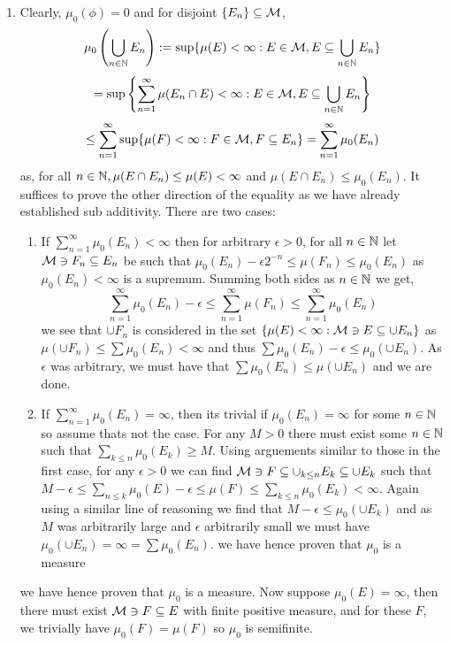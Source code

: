 \documentclass[12pt,a4paper]{article}
\begin{document}
\begin{solution}
    \begin{enumerate}[label=\alph*.]
        \item Clearly, $\mu_0(\phi)=0$ and for disjoint $\{E_n\}\subseteq\mathcal{M}$, 
        $$\mu_0\left(\bigcup_{n\in\mathbb{N}}E_n\right):=\sup\{\mu(E)<\infty:E\in\mathcal{M},E\subseteq\bigcup_{n\in\mathbb{N}}E_n\}$$
        $$=\sup\left\{\sum_{n=1}^\infty\mu(E_n\cap E)<\infty:E\in\mathcal{M},E\subseteq\bigcup_{n\in\mathbb{N}}E_n\right\}$$
        $$\leq\sum_{n=1}^\infty\sup\{\mu(F)<\infty:F\in\mathcal{M},F\subseteq E_n\}=\sum_{n=1}^\infty\mu_0(E_n)$$
        as, for all $n\in\mathbb{N},\mu(E\cap E_n)\leq\mu(E)<\infty$ and $\mu(E\cap E_n)\leq\mu_0(E_n)$.
        It suffices to prove the other direction of the equality as we have already established sub additivity. 
        There are two cases:
        \begin{enumerate}[label=\Roman*.]
            \item If $\sum_{n=1}^{\infty}\mu_0(E_n)<\infty$ then for arbitrary $\epsilon>0$, for all $n\in\mathbb{N}$ let $\mathcal{M}\ni F_n\subseteq E_n$ be such that $\mu_0(E_n)-\epsilon 2^{-n}\leq\mu(F_n)\leq\mu_0(E_n)$ as $\mu_0(E_n)<\infty$ is a supremum. 
            Summing both sides as $n\in\mathbb{N}$ we get,
            $$\sum_{n=1}^\infty\mu_0(E_n)-\epsilon\leq\sum_{n=1}^\infty\mu(F_n)\leq\sum_{n=1}^\infty\mu_0(E_n)$$
            we see that $\cup F_n$ is considered in the set $\{\mu(E)<\infty:\mathcal{M}\ni E\subseteq\cup E_n\}$ as $\mu(\cup F_n)\leq\sum\mu_0(E_n)<\infty$ and thus $\sum\mu_0(E_n)-\epsilon\leq\mu_0(\cup E_n)$. 
            As $\epsilon$ was arbitrary, we must have that $\sum\mu_0(E_n)\leq\mu(\cup E_n)$ and we are done.
            \item If $\sum_{n=1}^\infty\mu_0(E_n)=\infty$, then its trivial if $\mu_0(E_n)=\infty$ for some $n\in\mathbb{N}$ so assume thats not the case. 
            For any $M>0$ there must exist some $n\in\mathbb{N}$ such that $\sum_{k\leq n}\mu_0(E_k)\geq M$. 
            Using arguements similar to those in the first case, for any $\epsilon>0$ we can find $\mathcal{M}\ni F\subseteq\cup_{k\leq n}E_k\subseteq\cup E_k$ such that $M-\epsilon\leq\sum_{n\leq k}\mu_0(E)-\epsilon\leq\mu(F)\leq\sum_{k\leq n}\mu_0(E_k)<\infty$.
            Again using a similar line of reasoning we find that $M-\epsilon\leq\mu_0(\cup E_k)$ and as $M$ was arbitrarily large and $\epsilon$ arbitrarily small we must have $\mu_0(\cup E_n)=\infty=\sum\mu_0(E_n)$.
            we have hence proven that $\mu_0$ is a measure
        \end{enumerate}
        we have hence proven that $\mu_0$ is a measure. Now suppose $\mu_0(E)=\infty$, then there must exist $\mathcal{M}\ni F\subseteq E$ with finite positive measure, and for these $F$, we trivially have $\mu_0(F)=\mu(F)$ so $\mu_0$ is semifinite.

\end{enumerate}
\end{solution}
\end{document}
